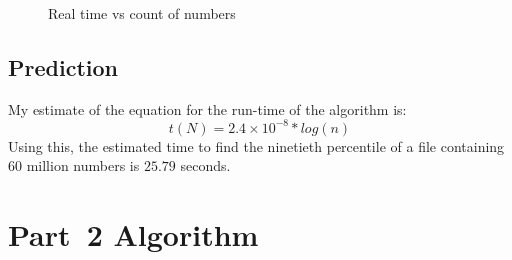 \documentclass{article}
\begin{document}
 \begin{figure}
   \centering
  
   \caption{Real time vs count of numbers}
   \label{fig:experiment1}
 \end{figure}

\subsection{Prediction}
\label{sec:prediction1}

My estimate of the equation for the run-time of the algorithm is:
\begin{equation}
  \label{eq:estimated_runtime1}
  t(N) = 2.4 \times 10^{-8}*log(n)
\end{equation}
Using this, the estimated time to find the ninetieth percentile of a
file containing 60 million numbers is $25.79$ seconds.

\section{Part~2 Algorithm}
\label{sec:algorithm2}
\end{document}
